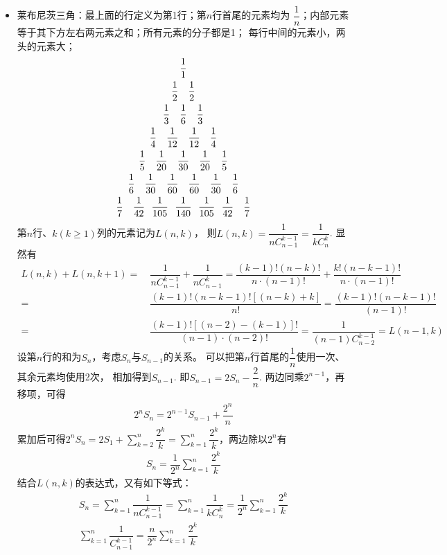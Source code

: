 \begin{itemize}[leftmargin=\inteval{\myitemleftmargin}pt,itemsep=
   \inteval{\myitemitempsep}pt,topsep=\inteval{\myitemtopsep}pt]
\item 莱布尼茨三角：最上面的行定义为第1行；第$n$行首尾的元素均为
$\dfrac{1}{n}$；内部元素等于其下方左右两元素之和；所有元素的分子都是1；
每行中间的元素小，两头的元素大；
\begin{gather*}
    \dfrac{1}{1} \\
    \dfrac{1}{2}\q \dfrac{1}{2} \\
    \dfrac{1}{3}\q \dfrac{1}{6} \q \dfrac{1}{3} \\   
    \dfrac{1}{4}\q \dfrac{1}{12} \q \dfrac{1}{12} \q \dfrac{1}{4} \\
    \dfrac{1}{5}\q \dfrac{1}{20} \q \dfrac{1}{30} \q \dfrac{1}{20} \q
    \dfrac{1}{5} \\
    \dfrac{1}{6}\q \dfrac{1}{30} \q \dfrac{1}{60} \q \dfrac{1}{60} \q
    \dfrac{1}{30}\q \dfrac{1}{6} \\
    \dfrac{1}{7}\q \dfrac{1}{42} \ \ \dfrac{1}{105} \ \ \dfrac{1}{140} \ \ 
    \dfrac{1}{105}\ \ \dfrac{1}{42}  \q \dfrac{1}{7}
\end{gather*}
第$n$行、$k(k\geq 1)$列的元素记为$L(n,k)$，
则$L(n,k)=\dfrac{1}{nC_{n-1}^{k-1}}=\dfrac{1}{kC_n^k}$. 
显然有
\begin{align*}
    L(n,k)+L(n,k+1)=&\ \dfrac{1}{nC_{n-1}^{k-1}}+
    \dfrac{1}{nC_{n-1}^{k}}=\dfrac{(k-1)!(n-k)!}{n\cdot(n-1)!}+
    \dfrac{k!(n-k-1)!}{n\cdot(n-1)!} \\
    =&\ \dfrac{(k-1)!(n-k-1)![(n-k)+k]}{n!}
    = \dfrac{(k-1)!(n-k-1)!}{(n-1)!} \\
    =&\ \dfrac{(k-1)![(n-2)-(k-1)]!}{(n-1)\cdot (n-2)!}=
    \dfrac{1}{(n-1)C_{n-2}^{k-1}}=L(n-1,k)
\end{align*}
设第$n$行的和为$S_n$，考虑$S_n$与$S_{n-1}$的关系。
可以把第$n$行首尾的$\dfrac{1}{n}$使用一次、其余元素均使用2次，
相加得到$S_{n-1}$. 即$S_{n-1}=2S_{n}-\dfrac{2}{n}$. 
两边同乘$2^{n-1}$，再移项，可得
\begin{gather*}
    2^{n}S_{n}=2^{n-1}S_{n-1}+\dfrac{2^{n}}{n}
\end{gather*}
累加后可得$ 2^{n}S_{n}=2S_{1}+\sum\limits_{k=2}^{n} \dfrac{2^{k}}{k}=
\sum\limits_{k=1}^{n} \dfrac{2^{k}}{k} $，两边除以$2^n$有
\begin{gather*}
    S_n=\dfrac{1}{2^n}\sum_{k=1}^{n} \dfrac{2^{k}}{k}
\end{gather*}
结合$L(n,k)$的表达式，又有如下等式：
\begin{gather*}
    S_n=\sum_{k=1}^{n}\dfrac{1}{nC_{n-1}^{k-1}}
    =\sum_{k=1}^{n}\dfrac{1}{kC_n^k}
    =\dfrac{1}{2^n}\sum_{k=1}^{n} \dfrac{2^{k}}{k}  \\
    \sum_{k=1}^{n}\dfrac{1}{C_{n-1}^{k-1}}=
    \dfrac{n}{2^n}\sum_{k=1}^{n} \dfrac{2^{k}}{k}
\end{gather*}


\end{itemize}
